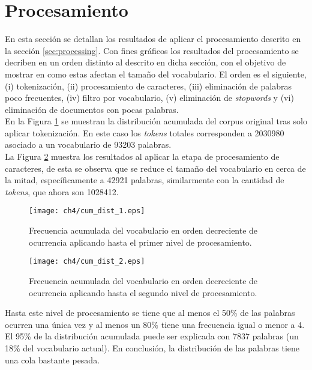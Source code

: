 \section{Procesamiento}
\label{sec:data_processing}

En esta sección se detallan los resultados de aplicar el procesamiento descrito en la sección \ref{sec:processing}. Con fines gráficos los resultados del procesamiento se decriben en un orden distinto al descrito en dicha sección, con el objetivo de mostrar en como estas afectan el tamaño del vocabulario. El orden es el siguiente, (i) tokenización, (ii) procesamiento de caracteres, (iii) eliminación de palabras poco frecuentes, (iv) filtro por vocabulario, (v) eliminación de \textit{stopwords} y (vi) eliminación de documentos con pocas palabras.\\

En la Figura \ref{img:cum_dist1} se muestran la distribución acumulada del corpus original tras solo aplicar tokenización. En este caso los \textit{tokens} totales corresponden a 2030980 asociado a un vocabulario de 93203 palabras.\\

La Figura \ref{img:cum_dist2} muestra los resultados al aplicar la etapa de procesamiento de caracteres, de esta se observa que se reduce el tamaño del vocabulario en cerca de la mitad, específicamente a 42921 palabras, similarmente con la cantidad de \textit{tokens}, que ahora son 1028412.

\begin{figure}
    \centering
    \texttt{[image: ch4/cum\_dist\_1.eps]}
    \caption{Frecuencia acumulada del vocabulario en orden decreciente de ocurrencia aplicando hasta el primer nivel de procesamiento.}
    \label{img:cum_dist1}
\end{figure}

\begin{figure}
    \centering
    \texttt{[image: ch4/cum\_dist\_2.eps]}
    \caption{Frecuencia acumulada del vocabulario en orden decreciente de ocurrencia aplicando hasta el segundo nivel de procesamiento.}
    \label{img:cum_dist2}
\end{figure}

Hasta este nivel de procesamiento se tiene que al menos el 50\% de las palabras ocurren una única vez y al menos un 80\% tiene una frecuencia igual o menor a 4. El 95\% de la distribución acumulada puede ser explicada con 7837 palabras (un 18\% del vocabulario actual). En conclusión, la distribución de las palabras tiene una cola bastante pesada.\\

